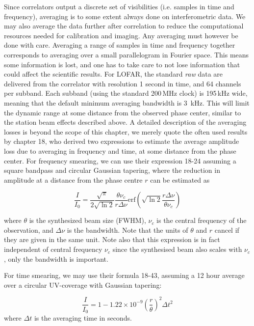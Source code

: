 \documentclass[graybox]{svmult}
\begin{document}
Since correlators output a discrete set of visibilities (i.e. samples in time
and frequency), averaging is to some extent always done on interferometric
data. We may also average the data further after correlation to reduce the
computational resources needed for calibration and imaging. Any averaging must
however be done with care.  Averaging a range of samples in time and frequency
together corresponds to averaging over a small parallelogram in Fourier space.
This means some information is lost, and one has to take care to not lose
information that could affect the scientific results. For LOFAR, the standard
\emph{raw} data are delivered from the correlator with resolution 1 second in
time, and 64 channels per subband.  Each subband (using the standard 200\,MHz
clock) is 195\,kHz wide, meaning that the default minimum averaging bandwidth
is 3~kHz. This will limit the dynamic range at some distance from the observed
phase center, similar to the station beam effects described above.  A detailed
description of the averaging losses is beyond the scope of this chapter, we
merely quote the often used results by \cite{taylor99} chapter 18, who derived
two expressions to estimate the average amplitude loss due to averaging in
frequency and time, at some distance from the phase center.  For frequency
smearing, we can use their expression 18-24 assuming a square bandpass and
circular Gaussian tapering, where the reduction in amplitude at a distance from
the phase centre $r$ can be estimated as

\begin{equation}
\frac{I}{I_0} = \frac{\sqrt{\pi}}{2\sqrt{\ln{2}}}\frac{\theta \nu_c}{r \Delta
\nu}\mathrm{erf}\left(\sqrt{\ln{2}}\frac{r \Delta\nu}{\theta \nu_c}\right)
\label{eqn:freqloss}
\end{equation}

\noindent
where $\theta$ is the synthesized beam size (FWHM), $\nu_c$ is the central
frequency of the observation, and $\Delta \nu$ is the bandwidth. Note that the
units of $\theta$ and $r$ cancel if they are given in the same unit. Note also
that this expression is in fact independent of central frequency $\nu_c$ since
the synthesised beam also scales with $\nu_c$, only the bandwidth is important.

For time smearing, we may use their formula 18-43, assuming a 12 hour average
over a circular UV-coverage with Gaussian tapering:

\begin{equation}
\frac{I}{I_0} = 1-1.22\times 10^{-9}\left(\frac{r}{\theta}\right)^2\Delta t^2
\label{eqn:timeloss}
\end{equation}
where $\Delta t$ is the averaging time in seconds.
\end{document}

